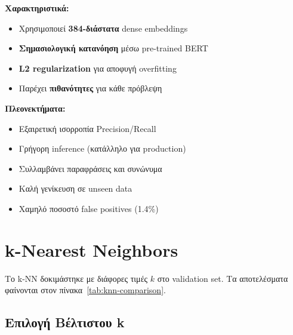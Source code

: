 \documentclass[12pt,a4paper,twoside]{book}
\begin{document}
\textbf{Χαρακτηριστικά:}
\begin{itemize}
    \item Χρησιμοποιεί \textbf{384-διάστατα} dense embeddings
    \item \textbf{Σημασιολογική κατανόηση} μέσω pre-trained BERT
    \item \textbf{L2 regularization} για αποφυγή overfitting
    \item Παρέχει \textbf{πιθανότητες} για κάθε πρόβλεψη
\end{itemize}

\textbf{Πλεονεκτήματα:}
\begin{itemize}
    \item Εξαιρετική ισορροπία Precision/Recall
    \item Γρήγορη inference (κατάλληλο για production)
    \item Συλλαμβάνει παραφράσεις και συνώνυμα
    \item Καλή γενίκευση σε unseen data
    \item Χαμηλό ποσοστό false positives (1.4\%)
\end{itemize}

\section{k-Nearest Neighbors}

Το k-NN δοκιμάστηκε με διάφορες τιμές \(k\) στο validation set. Τα αποτελέσματα φαίνονται στον πίνακα~\ref{tab:knn-comparison}.

\subsection{Επιλογή Βέλτιστου k}
\end{document}
